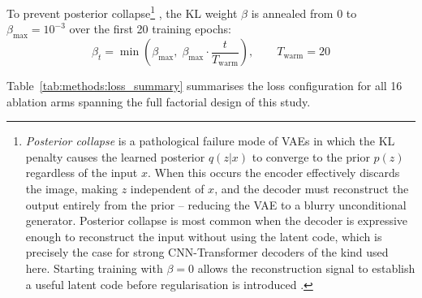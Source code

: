 \documentclass[12pt, a4paper, twoside, openright]{book}
\begin{document}
To prevent posterior collapse\footnote{\emph{Posterior collapse} is a pathological failure mode of VAEs in which the KL penalty causes the learned posterior $q(z|x)$ to converge to the prior $p(z)$ regardless of the input $x$. When this occurs the encoder effectively discards the image, making $z$ independent of $x$, and the decoder must reconstruct the output entirely from the prior -- reducing the VAE to a blurry unconditional generator. Posterior collapse is most common when the decoder is expressive enough to reconstruct the input without using the latent code, which is precisely the case for strong CNN-Transformer decoders of the kind used here. Starting training with $\beta=0$ allows the reconstruction signal to establish a useful latent code before regularisation is introduced \cite{bowman_generating_2016, lucas_dont_2019}.} \cite{fu_cyclical_2019, bowman_generating_2016}, the KL weight $\beta$ is annealed from 0 to $\beta_{\max} = 10^{-3}$
over the first 20 training epochs:
\begin{equation}
\label{eq:methods:beta}
\beta_t = \min\!\left(\beta_{\max},\; \beta_{\max} \cdot \frac{t}{T_{\mathrm{warm}}}\right),
\qquad T_{\mathrm{warm}} = 20
\end{equation}

Table~\ref{tab:methods:loss_summary} summarises the loss configuration for all 16 ablation arms spanning the full factorial design of this study.
\end{document}

